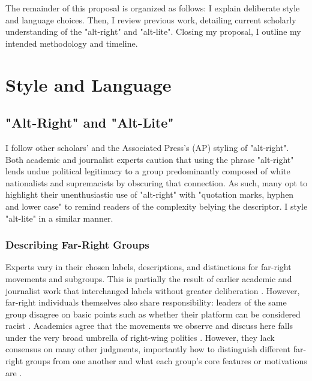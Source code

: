 \documentclass[acmlarge, screen, authorversion]{acmart}
\begin{document}
\medskip

The remainder of this proposal is organized as follows: I explain deliberate style and language
choices. Then, I review previous work, detailing current scholarly understanding of the "alt-right"
and "alt-lite". Closing my proposal, I outline my intended methodology and timeline.

\section{Style and Language}

\subsection{"Alt-Right" and "Alt-Lite"}

I follow other scholars’ \cite{hartzellAltWhiteConceptualizingAltRight, massanariRethinkingResearchEthics2018} and the
Associated Press’s (AP) \cite{johndaniszewskiWritingAltright2016} styling of "alt-right".
Both academic and journalist experts caution that using the
phrase "alt-right" lends undue political legitimacy to a group predominantly
composed of white nationalists and supremacists by obscuring that
connection. As such, many opt to highlight their unenthusiastic use of
"alt-right" with "quotation marks, hyphen and lower case"
\cite{johndaniszewskiWritingAltright2016} to remind readers of the complexity belying the
descriptor. I style "alt-lite" in a similar manner.

\subsubsection{Describing Far-Right Groups}

Experts vary in their chosen labels, descriptions, and distinctions for far-right movements and
subgroups. This is partially the result of earlier academic and journalist work
that interchanged labels without greater deliberation
\cite{muddeFarRightToday2019}. However,
far-right individuals themselves also share responsibility:
leaders of the same group disagree on basic points
such as whether their platform can be considered racist \cite{muddeFarRightToday2019}.
Academics agree that the movements we observe and discuss here falls under the very broad umbrella of right-wing politics \cite{muddeFarRightToday2019}. However, they lack consensus on many other judgments, importantly how to distinguish different far-right groups from one another and what each group's core features or motivations are \cite{muddeFarRightToday2019}.
\end{document}
